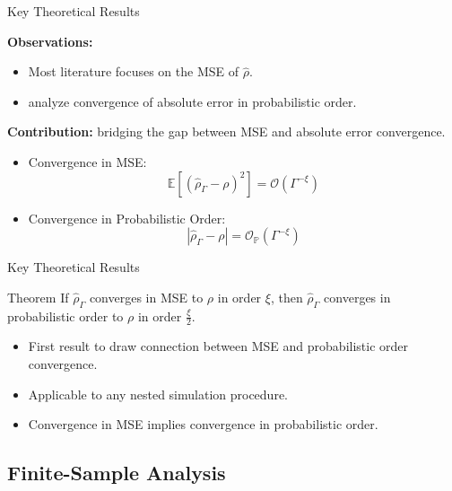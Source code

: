 \documentclass[9pt,handout]{beamer}
\begin{document}
\begin{frame}{Key Theoretical Results}

\textbf{Observations:}
\begin{itemize}
\item Most literature focuses on the MSE of $\hat{\rho}$.
\item \citet{wang2022smooth} analyze convergence of absolute error in probabilistic order.
\end{itemize}

\vspace{10pt}

\textbf{Contribution:} bridging the gap between MSE and absolute error convergence.
\begin{itemize}
    \item Convergence in MSE:
    $$ \mathbb{E} \left[ \left( \hat{\rho}_{\Gamma} - \rho \right)^2 \right] = \mathcal{O} \left( \Gamma^{-\xi} \right) $$
    \item Convergence in Probabilistic Order:
    $$ |\hat{\rho}_{\Gamma} - \rho| = \mathcal{O}_{\mathbb{P}}(\Gamma^{-\xi}) $$
\end{itemize}

\end{frame}

\begin{frame}{Key Theoretical Results}

\begin{block}{Theorem}
    If $\hat{\rho}_{\Gamma}$ converges in MSE to $\rho$ in order $\xi$, then $\hat{\rho}_{\Gamma}$ converges in probabilistic order to $\rho$ in order $\frac{\xi}{2}$.
\end{block}

\begin{itemize}
    \item First result to draw connection between MSE and probabilistic order convergence.
    \item Applicable to any nested simulation procedure.
    \item Convergence in MSE implies convergence in probabilistic order.
\end{itemize}

\end{frame}

\subsection{Finite-Sample Analysis}
\end{document}
